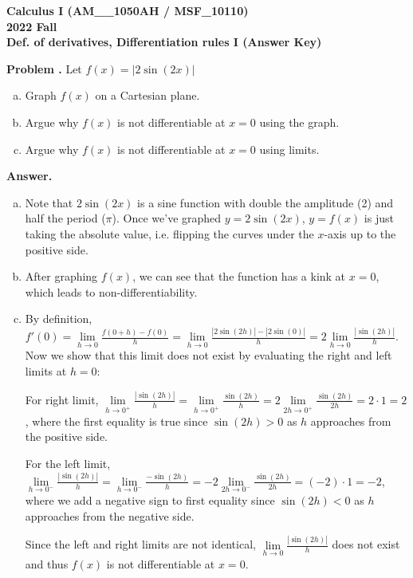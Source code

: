 \documentclass[11pt,letterpaper]{article}
\newcounter{problem}
\newcommand{\problem}{
	\stepcounter{problem}%
	\noindent \textbf{Problem \theproblem. }%
}
\newcommand{\answer}{\noindent \textbf{Answer. }}
\begin{document}
\noindent\textbf{\large Calculus I (AM\_\_1050AH / MSF\_10110) \\ 2022 Fall \\ Def. of derivatives, Differentiation rules I (Answer Key)}

\bigskip

\problem Let $f(x) = |2\sin(2x)|$
\begin{enumerate}[(a)]
    \item Graph $f(x)$ on a Cartesian plane.
    \item Argue why $f(x)$ is not differentiable at $x=0$ using the graph. 
    \item Argue why $f(x)$ is not differentiable at $x=0$ using limits.
\end{enumerate}\vspace{6mm}

\answer
\begin{enumerate}[(a)]
    \item Note that $2\sin (2x)$ is a sine function with double the amplitude (2) and half the period ($\pi$).  Once we've graphed $y = 2\sin (2x)$, $y = f(x)$ is just taking the absolute value, i.e. flipping the curves under the $x$-axis up to the positive side.
    \item After graphing $f(x)$, we can see that the function has a kink at $x=0$, which leads to non-differentiability.
    \item By definition, $f'(0) = \lim\limits_{h \to 0} \frac{f(0+h)-f(0)}{h} = \lim\limits_{h \to 0}\frac{|2\sin(2h)|-|2\sin (0)|}{h} = 2\lim\limits_{h \to 0} \frac{|\sin(2h)|}{h}$.  Now we show that this limit does not exist by evaluating the right and left limits at $h=0$:\vspace{1mm}
    
    For right limit, $\lim\limits_{h \to 0^+}\frac{|\sin(2h)|}{h} = \lim\limits_{h \to 0^+}\frac{\sin(2h)}{h} = 2\lim\limits_{2h \to 0^+}\frac{\sin(2h)}{2h} = 2 \cdot 1 = 2$, where the first equality is true since $\sin(2h)>0$ as $h$ approaches from the positive side.  \vspace{1mm}
    
    For the left limit, $\lim\limits_{h \to 0^-}\frac{|\sin(2h)|}{h} = \lim\limits_{h \to 0^-}\frac{-\sin(2h)}{h} = -2\lim\limits_{2h \to 0^-}\frac{\sin(2h)}{2h} = (-2) \cdot 1 = -2$, where we add a negative sign to first equality since $\sin(2h)<0$ as $h$ approaches from the negative side. \vspace{1mm}
    
    Since the left and right limits are not identical, $\lim\limits_{h \to 0} \frac{|\sin(2h)|}{h}$ does not exist and thus $f(x)$ is not differentiable at $x=0$.
\end{enumerate}\vspace{6mm}
\end{document}
